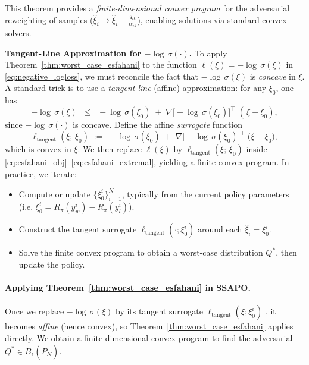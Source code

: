 This theorem provides a \emph{finite-dimensional convex program} 
for the adversarial reweighting of samples 
(\(\hat{\xi}_i \mapsto \hat{\xi}_i - \tfrac{q_{ik}}{\alpha_{ik}}\)), 
enabling solutions via standard convex solvers.

\noindent
\textbf{Tangent-Line Approximation for $-\log\,\sigma(\cdot)$.}
To apply Theorem~\ref{thm:worst_case_esfahani} to the function 
\(\ell(\xi) = -\log\,\sigma(\xi)\) in \eqref{eq:negative_logloss}, 
we must reconcile the fact that $-\log\,\sigma(\xi)$ is \emph{concave} in $\xi$.  
A standard trick is to use a \emph{tangent-line} (affine) approximation: 
for any $\xi_0$, one has
\begin{equation}
\label{eq:concave_tangent}
-\log\,\sigma(\xi)
\;\;\le\;\;
-\log\,\sigma(\xi_0)
\;+\;
\nabla \bigl[-\!\log\,\sigma(\xi_0)\bigr]^\top\;(\,\xi - \xi_0),
\end{equation}
since $-\!\log\,\sigma(\cdot)$ is concave.  
Define the affine \emph{surrogate} function
\begin{equation}
\label{eq:ell_tangent}
\ell_{\text{tangent}}(\xi;\,\xi_0)
\;:=\;
-\!\log\,\sigma(\xi_0)
\;+\;
\nabla \bigl[-\!\log\,\sigma(\xi_0)\bigr]^\top\;\bigl(\xi - \xi_0\bigr),
\end{equation}
which is convex in $\xi$.  We then replace 
$\ell(\xi)$ by $\ell_{\text{tangent}}(\xi;\,\xi_0)$ inside 
\eqref{eq:esfahani_obj}--\eqref{eq:esfahani_extremal}, 
yielding a finite convex program.  In practice, we iterate:

\begin{itemize}
\item Compute or update $\{\xi_0^i\}_{i=1}^N$, typically from the current policy 
      parameters (i.e. $\xi_0^i = R_{\pi}(y_w^i)-R_{\pi}(y_l^i)$).
\item Construct the tangent surrogate $\ell_{\text{tangent}}(\cdot;\xi_0^i)$ 
      around each $\hat{\xi}_i = \xi_0^i$.
\item Solve the finite convex program to obtain a worst-case distribution 
      $Q^{*}$, then update the policy.
\end{itemize}



\paragraph{Applying Theorem~\ref{thm:worst_case_esfahani} in SSAPO.}
Once we replace $-\!\log\,\sigma(\xi)$ by its tangent surrogate $\ell_{\text{tangent}}(\xi;\xi_0^i)$ , it becomes \emph{affine} (hence convex), so Theorem~\ref{thm:worst_case_esfahani} applies directly.  We obtain a finite-dimensional convex program to find the adversarial $Q^*\in B_\epsilon(\hat{P}_N)$.  



